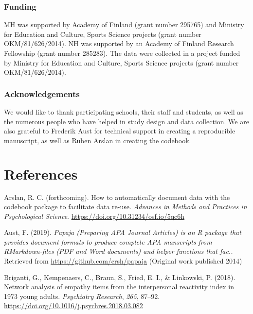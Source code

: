 \documentclass[british,man]{apa6}
\begin{document}
\hypertarget{funding}{%
\subsubsection{Funding}\label{funding}}

MH was supported by Academy of Finland (grant number 295765) and Ministry for Education and Culture, Sports Science projects (grant number OKM/81/626/2014). NH was supported by an Academy of Finland Research Fellowship (grant number 285283). The data were collected in a project funded by Ministry for Education and Culture, Sports Science projects (grant number OKM/81/626/2014).

\hypertarget{acknowledgements}{%
\subsubsection{Acknowledgements}\label{acknowledgements}}

We would like to thank participating schools, their staff and students, as well as the numerous people who have helped in study design and data collection. We are also grateful to Frederik Aust for technical support in creating a reproducible manuscript, as well as Ruben Arslan in creating the codebook.

\newpage

\hypertarget{references}{%
\section{References}\label{references}}

\begingroup
\setlength{\parindent}{-0.5in}
\setlength{\leftskip}{0.5in}

\hypertarget{refs}{}
\leavevmode\hypertarget{ref-arslanHowAutomaticallyDocument}{}%
Arslan, R. C. (forthcoming). How to automatically document data with the codebook package to facilitate data re-use. \emph{Advances in Methods and Practices in Psychological Science}. \url{https://doi.org/10.31234/osf.io/5qc6h}

\leavevmode\hypertarget{ref-austPapajaPreparingAPA2019}{}%
Aust, F. (2019). \emph{Papaja (Preparing APA Journal Articles) is an R package that provides document formats to produce complete APA manscripts from RMarkdown-files (PDF and Word documents) and helper functions that fac..} Retrieved from \url{https://github.com/crsh/papaja} (Original work published 2014)

\leavevmode\hypertarget{ref-brigantiNetworkAnalysisEmpathy2018}{}%
Briganti, G., Kempenaers, C., Braun, S., Fried, E. I., \& Linkowski, P. (2018). Network analysis of empathy items from the interpersonal reactivity index in 1973 young adults. \emph{Psychiatry Research}, \emph{265}, 87--92. \url{https://doi.org/10.1016/j.psychres.2018.03.082}
\end{document}

